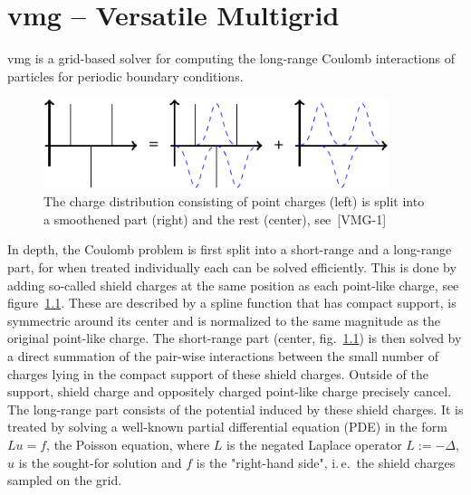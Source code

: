 % 
% 
% 
% 
% 
%
\chapter{vmg -- Versatile Multigrid}
\label{cha:vmg}

\newcommand{\vmgcite}[1]{\mbox{[VMG-#1]}}


vmg is a grid-based solver for computing the long-range Coulomb interactions of particles for periodic boundary conditions.

\begin{figure}
\includegraphics[width=0.9\textwidth]{figures/vmg_short-long-splitting.pdf}
\caption{The charge distribution consisting of point charges (left) is split into a smoothened part (right) and the rest (center), see~\vmgcite{1}}
\label{fig:vmg_long-short-splitting}
\end{figure}

In depth, the Coulomb problem is first split into a short-range and a long-range part, for when treated individually each can be solved efficiently. This is done by adding so-called shield charges at the same position as each point-like charge, see figure~\ref{fig:vmg_long-short-splitting}. These are described by a spline function that has compact support, is symmectric around its center and is normalized to the same magnitude as the original point-like charge. The short-range part (center,  fig.~\ref{fig:vmg_long-short-splitting}) is then solved by a direct summation of the pair-wise interactions between the small number of charges lying in the compact support of these shield charges. Outside of the support, shield charge and oppositely charged point-like charge precisely cancel. The long-range part consists of the potential induced by these shield charges. It is treated by solving a well-known partial differential equation (PDE) in the form $Lu=f$, the Poisson equation, where $L$ is the negated Laplace operator $L:=-\Delta$, $u$ is the sought-for solution and $f$ is the "right-hand side", i.\,e.~the shield charges sampled on the grid.

